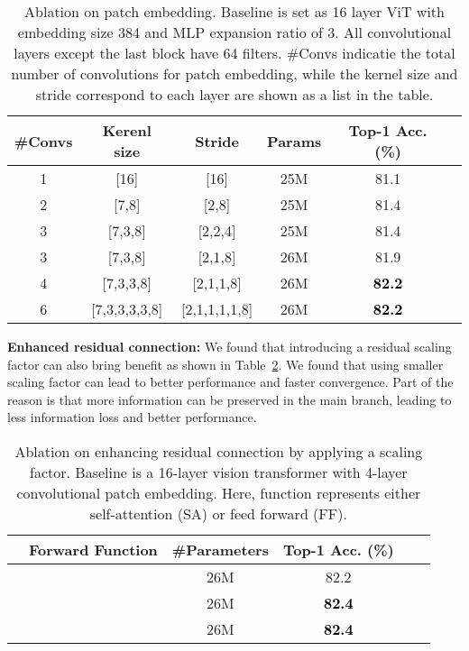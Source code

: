 \documentclass{article}
\newcommand{\highlight}[1]{\textcolor{black}{\textbf{#1}}}
\newcommand{\myPara}[1]{\noindent\textbf{#1:}}
\begin{document}
\begin{table}[h]
  \centering
  \small
  \setlength\tabcolsep{1.1mm}
  \renewcommand\arraystretch{1.1}
  \caption{Ablation on patch embedding. Baseline is set as 16 layer ViT with embedding size 384 and MLP expansion ratio of 3.
  All convolutional layers except the last block have 64 filters. \#Convs indicatie the total number of convolutions for patch embedding, while the kernel size and stride correspond to each layer are shown as a list in the table.}
  \label{tab:abl_conv}
  \begin{tabular}{cccccc} \toprule[0.5pt]
    \#Convs & Kerenl size & Stride & Params & Top-1 Acc. (\%) \\ \midrule[0.5pt] \midrule[0.5pt]
    1 & [16] & [16] &25M &  81.1\\
    2 & [7,8] & [2,8] &25M &  81.4\\ 
    3 & [7,3,8] & [2,2,4] &25M &  81.4\\
    3 & [7,3,8] & [2,1,8] &26M & 81.9\\
    4 & [7,3,3,8] & [2,1,1,8] &26M & \highlight{82.2}\\
    6 & [7,3,3,3,3,8] & [2,1,1,1,1,8] &26M & \highlight{82.2}\\

    \bottomrule[0.5pt]
  \end{tabular}
\end{table}

\myPara{Enhanced residual connection}
We found that introducing a residual scaling factor can also bring benefit 
as shown in Table~\ref{tab:abl_res}.
We found that using smaller scaling factor can lead to better performance and faster convergence.
Part of the reason is that more information can be preserved in the main branch, leading to less information loss and better performance.

\begin{table}[h]
  \centering
  \small
  \setlength\tabcolsep{2.6mm}
  \renewcommand\arraystretch{1}
  \caption{Ablation on enhancing residual connection by applying a scaling factor. 
  Baseline is a 16-layer vision transformer with 4-layer convolutional patch embedding. 
  Here, function  represents either self-attention (SA) or feed forward (FF).}
  
  \label{tab:abl_res}
  \begin{tabular}{lccccc} \toprule[0.5pt]
    &Forward Function & \#Parameters & Top-1 Acc. (\%) \\ \midrule[0.5pt] \midrule[0.5pt]
      &   &26M &  82.2\\
     &  &26M &  \highlight{\textbf{82.4}}\\ 
     &  &26M &  \highlight{\textbf{82.4}}\\

    \bottomrule[0.5pt]
  \end{tabular}
\end{table}
\end{document}
